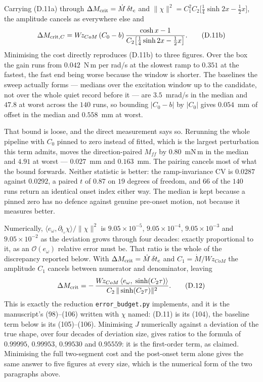 \documentclass[11pt]{article}
\newcommand{\Wz}{W\!z_{CoM}}
\begin{document}
Carrying (D.11a) through $\Delta M_{\rm crit} = \dot M\,\delta t_c$ and
$\|\chi\|^2 = C_1^2C_2\bigl[\tfrac14\sinh2x - \tfrac12 x\bigr]$, the
amplitude cancels as everywhere else and
\begin{equation}
  \Delta M_{{\rm crit},C}
  = \Wz\,(C_0 - b)\,
    \frac{\cosh x - 1}{C_2\bigl[\tfrac14\sinh 2x - \tfrac12 x\bigr]} .
  \tag{D.11b}
\end{equation}
Minimising the cost directly reproduces (D.11b) to three figures. Over
the box the gain runs from $0.042$~N\,m per rad/s at the slowest ramp to
$0.351$ at the fastest, the fast end being worse because the window is
shorter. The baselines the sweep actually forms --- medians over the
excitation window up to the candidate, not over the whole quiet record
before it --- are $3.5$~mrad/s in the median and $47.8$ at worst across
the $140$ runs, so bounding $|C_0-b|$ by $|C_0|$ gives $0.054$~mm of
offset in the median and $0.558$~mm at worst.

That bound is loose, and the direct measurement says so. Rerunning the
whole pipeline with $C_0$ pinned to zero instead of fitted, which is the
largest perturbation this term admits, moves the direction-paired
$M_{ff}$ by $0.80$~mN\,m in the median and $4.91$ at worst ---
$0.027$~mm and $0.163$~mm. The pairing cancels most of what the bound
forwards. Neither statistic is better: the ramp-invariance CV is
$0.0287$ against $0.0292$, a paired $t$ of $0.87$ on $19$ degrees of
freedom, and $66$ of the $140$ runs return an identical onset index
either way. The median is kept because a pinned zero has no defence
against genuine pre-onset motion, not because it measures better.

Numerically, $\langle e_\omega,\partial_{t_c}\chi\rangle/\|\chi\|^2$ is
$9.05\times10^{-5}$, $9.05\times10^{-4}$, $9.05\times10^{-3}$ and
$9.05\times10^{-2}$ as the deviation grows through four decades: exactly
proportional to it, as an $\mathcal{O}(e_\omega)$ relative error must
be. That ratio is the whole of the discrepancy reported below. With
$\Delta M_{\rm crit} = \dot M\,\delta t_c$ and $C_1 = \dot M/\Wz$ the
amplitude $C_1$ cancels between numerator and denominator, leaving
\begin{equation}
  \Delta M_{\rm crit}
  = -\,\frac{\Wz\,\langle e_\omega,\;\sinh(C_2\tau)\rangle}
            {C_2\,\|\sinh(C_2\tau)\|^2}.
  \tag{D.12}
\end{equation}
This is exactly the reduction \texttt{error\_budget.py} implements, and
it is the manuscript's (98)--(106) written with $\chi$ named:
(D.11) is its (104), the baseline term below is its (105)--(106).
Minimising $J$ numerically against a deviation of the true shape, over
four decades of deviation size, gives ratios to the formula of
$0.99995$, $0.99953$, $0.99530$ and $0.95559$: it is the first-order
term, as claimed. Minimising the full two-segment cost and the
post-onset term alone gives the same answer to five figures at every
size, which is the numerical form of the two paragraphs above.
\end{document}
